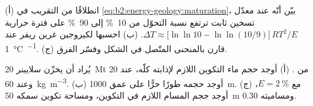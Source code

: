 \begin{exercise}[$\star\star\star$]\label{exo:b2:energy-geology:11}
(أ) انطلاقًا من التقريب في \eqref{eq:b2:energy-geology:maturation}، بيّن أنّه عند معدّل تسخين
ثابت ترتفع نسبة التحوّل من \qty{10}{\percent} إلى \qty{90}{\percent} على فترة
حرارية $\Delta T \approx \bigl[\ln\ln 10 - \ln\ln(10/9)\bigr]\,RT^2/E$. (ب) احسبها
لكيروجين غرين ريفر عند \qty{1}{\celsius\per\Myr}. (ج) قارن بالمنحنى المتّصل في
الشكل وفسّر الفرق.
\end{exercise}

\begin{exercise}[$\star\star\star$]\label{exo:b2:energy-geology:12}
يُراد أن يخزّن سلايبنر \qty{20}{Mt} من . (أ) أوجد حجم ماء التكوين اللازم
لإذابته كلّه، عند 20 وعند \qty{60}{kg.m^{-3}}. (ب) أوجد حجمه طورًا حرًّا على عمق
\qty{1000}{m}. (ج) مع $E = \qty{2}{\percent}$، أوجد حجم المسام اللازم في التكوين،
ومساحة تكوين سمكه \qty{50}{m} ومساميته 0.30.
\end{exercise}

